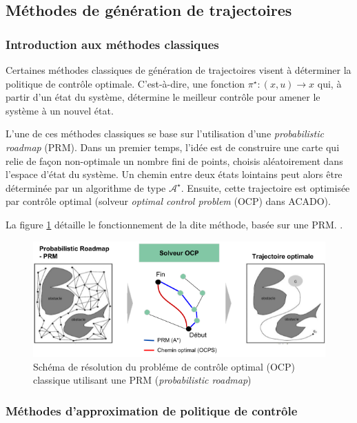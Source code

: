 \documentclass[a4paper,12pt]{report}
\begin{document}
\subsection{Méthodes de génération de trajectoires}
\subsubsection{Introduction aux méthodes classiques}

Certaines méthodes classiques de génération de trajectoires visent à déterminer la politique de contrôle optimale. C'est-à-dire, une fonction $\pi^\star : (x, u) \rightarrow x$ qui, à partir d'un état du système, détermine le meilleur contrôle pour amener le système à un nouvel état. 


L'une de ces méthodes classiques se base sur l'utilisation d'une \textit{probabilistic roadmap} (PRM). Dans un premier temps, l'idée est de construire une carte qui relie de façon non-optimale un nombre fini de points, choisis aléatoirement dans l'espace d'état du système. Un chemin entre deux états lointains peut alors être déterminée par un algorithme de type $\mathcal{A}^\star$. Ensuite, cette trajectoire est optimisée par contrôle optimal (solveur \textit{optimal control problem} (OCP) dans ACADO).

La figure \ref{fig:PRM} détaille le fonctionnement de la dite méthode, basée sur une PRM. .


\begin{figure}[!htb]
\centering
\includegraphics[width=14cm]{image1_1.png}
\caption{Schéma de résolution du probléme de contrôle optimal (OCP) classique utilisant une PRM (\textit{probabilistic roadmap})}
\label{fig:PRM}
\end{figure}



\subsubsection{Méthodes d'approximation de politique de contrôle}
\end{document}
